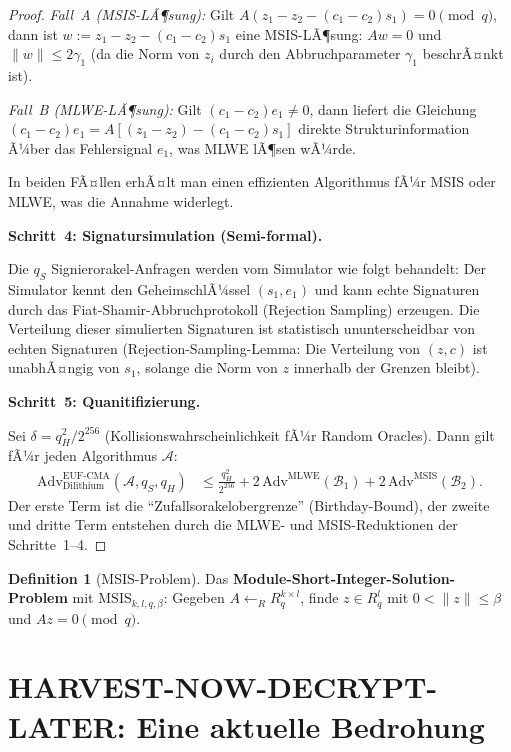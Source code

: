 ﻿\documentclass[a4paper,12pt]{article}
\theoremstyle{definition}
\newtheorem{definition}{Definition}[section]
\begin{document}
\begin{proof}
\emph{Fall~A (MSIS-LÃ¶sung):}
Gilt $A(z_1-z_2-(c_1-c_2)s_1) = 0 \pmod{q}$, dann ist
$w := z_1 - z_2 - (c_1-c_2)s_1$ eine MSIS-LÃ¶sung:
$Aw = 0$ und $\|w\| \leq 2\gamma_1$
(da die Norm von $z_i$ durch den Abbruchparameter $\gamma_1$ beschrÃ¤nkt ist).

\emph{Fall~B (MLWE-LÃ¶sung):}
Gilt $(c_1-c_2)e_1 \neq 0$, dann liefert die Gleichung
$(c_1-c_2)e_1 = A[(z_1-z_2)-(c_1-c_2)s_1]$
direkte Strukturinformation Ã¼ber das Fehlersignal $e_1$,
was MLWE lÃ¶sen wÃ¼rde.

In beiden FÃ¤llen erhÃ¤lt man einen effizienten Algorithmus fÃ¼r MSIS oder MLWE,
was die Annahme widerlegt.

\textbf{Schritt~4: Signatursimulation (Semi-formal).}

Die $q_S$ Signierorakel-Anfragen werden vom Simulator wie folgt behandelt:
Der Simulator kennt den GeheimschlÃ¼ssel $(s_1, e_1)$ und kann echte Signaturen
durch das Fiat-Shamir-Abbruchprotokoll (Rejection Sampling) erzeugen.
Die Verteilung dieser simulierten Signaturen ist statistisch ununterscheidbar
von echten Signaturen (Rejection-Sampling-Lemma: Die Verteilung von $(z, c)$ 
ist unabhÃ¤ngig von $s_1$, solange die Norm von $z$ innerhalb der Grenzen bleibt).

\textbf{Schritt~5: Quanitifizierung.}

Sei $\delta = q_H^2 / 2^{256}$ (Kollisionswahrscheinlichkeit fÃ¼r Random Oracles).
Dann gilt fÃ¼r jeden Algorithmus $\mathcal{A}$:
\begin{align*}
\mathrm{Adv}^{\mathrm{EUF\text{-}CMA}}_{\mathrm{Dilithium}}(\mathcal{A}, q_S, q_H)
&\leq \frac{q_H^2}{2^{256}}
  + 2\,\mathrm{Adv}^{\mathrm{MLWE}}(\mathcal{B}_1)
  + 2\,\mathrm{Adv}^{\mathrm{MSIS}}(\mathcal{B}_2).
\end{align*}
Der erste Term ist die ``Zufallsorakelobergrenze'' (Birthday-Bound),
der zweite und dritte Term entstehen durch die MLWE- und MSIS-Reduktionen
der Schritte~1--4.
\end{proof}

\begin{definition}[MSIS-Problem]
Das \textbf{Module-Short-Integer-Solution-Problem} mit $\mathrm{MSIS}_{k,l,q,\beta}$:
Gegeben $A \leftarrow_R R_q^{k \times l}$, finde $z \in R_q^l$ mit $0 < \|z\| \leq \beta$
und $Az = 0 \pmod{q}$.
\end{definition}

\section{HARVEST-NOW-DECRYPT-LATER: Eine aktuelle Bedrohung}
\end{document}
